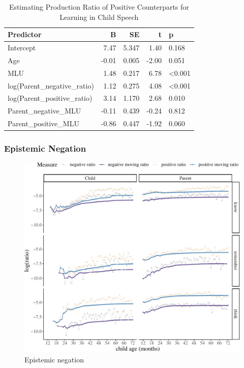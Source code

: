 \documentclass[
  english,
  man,floatsintext]{apa6}
\begin{document}
\begin{table}

\caption{\label{tab:unnamed-chunk-6}Estimating Production Ratio of Positive Counterparts for Learning in Child Speech}
\centering
\begin{tabular}[t]{l|r|r|r|l}
\hline
Predictor & B & SE & t & p\\
\hline
Intercept & 7.47 & 5.347 & 1.40 & 0.168\\
\hline
Age & -0.01 & 0.005 & -2.00 & 0.051\\
\hline
MLU & 1.48 & 0.217 & 6.78 & <0.001\\
\hline
log(Parent\_negative\_ratio) & 1.12 & 0.275 & 4.08 & <0.001\\
\hline
log(Parent\_positive\_ratio) & 3.14 & 1.170 & 2.68 & 0.010\\
\hline
Parent\_negative\_MLU & -0.11 & 0.439 & -0.24 & 0.812\\
\hline
Parent\_positive\_MLU & -0.86 & 0.447 & -1.92 & 0.060\\
\hline
\end{tabular}
\end{table}

\clearpage

\hypertarget{epistemic-negation}{%
\subsubsection{Epistemic Negation}\label{epistemic-negation}}

\begin{figure}[H]

{\centering \includegraphics{results_files/figure-latex/epistemic-1} 

}

\caption{Epistemic negation}\label{fig:epistemic}
\end{figure}
\end{document}
